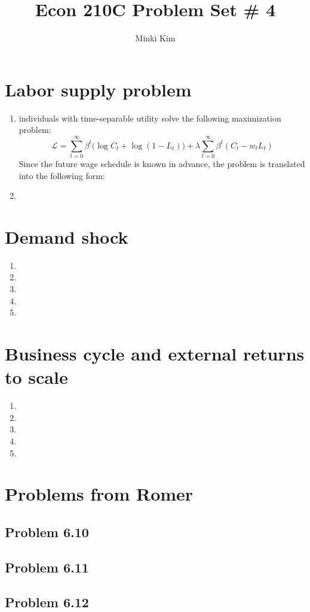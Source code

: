 \documentclass[11pt]{amsart}
\title{Econ 210C Problem Set \# 4}
\author{Minki Kim}
\begin{document}
\maketitle

\section{Labor supply problem}
\begin{enumerate}[label=(\alph*)]
	\item individuals with time-separable utility solve the following maximization problem: 
	\begin{equation*}
	\mathcal{L} = \sum_{t=0}^{\infty} \beta^t \bigg( \log C_t + \log (1-L_t) \bigg) + \lambda \sum_{t=0}^{\infty} \beta^t \left( C_t - w_t L_t \right)
	\end{equation*}
	Since the future wage schedule is known in advance, the problem is translated into the following form:
	\item
\end{enumerate}
\section{Demand shock}
\begin{enumerate}[label=(\alph*)]
	\item 
	\item
	\item
	\item
	\item
\end{enumerate}
\section{Business cycle and external returns to scale}
\begin{enumerate}[label=(\alph*)]
	\item 
	\item
	\item
	\item
	\item
\end{enumerate}
\section{Problems from Romer}
\subsection{Problem 6.10}
\subsection{Problem 6.11}
\subsection{Problem 6.12}
\end{document}
